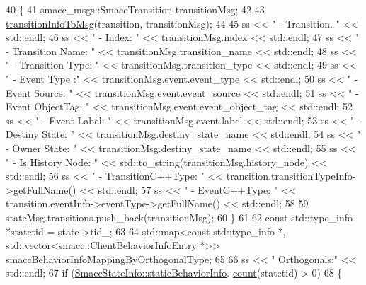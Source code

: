 \begin{DoxyCode}
40             \{
41                 smacc\_msgs::SmaccTransition transitionMsg;
42 
43                 \hyperlink{namespacesmacc_1_1introspection_a6c1b51c4d44fd5e41fe218f1ee150681}{transitionInfoToMsg}(transition, transitionMsg);
44 
45                 ss << \textcolor{stringliteral}{" - Transition.  "} << std::endl;
46                 ss << \textcolor{stringliteral}{"      - Index: "} << transitionMsg.index << std::endl;
47                 ss << \textcolor{stringliteral}{"      - Transition Name: "} << transitionMsg.transition\_name << std::endl;
48                 ss << \textcolor{stringliteral}{"      - Transition Type: "} << transitionMsg.transition\_type << std::endl;
49                 ss << \textcolor{stringliteral}{"      - Event Type :"} << transitionMsg.event.event\_type << std::endl;
50                 ss << \textcolor{stringliteral}{"      - Event Source: "} << transitionMsg.event.event\_source << std::endl;
51                 ss << \textcolor{stringliteral}{"      - Event ObjectTag: "} << transitionMsg.event.event\_object\_tag << std::endl;
52                 ss << \textcolor{stringliteral}{"      - Event Label: "} << transitionMsg.event.label << std::endl;
53                 ss << \textcolor{stringliteral}{"      - Destiny State: "} << transitionMsg.destiny\_state\_name << std::endl;
54                 ss << \textcolor{stringliteral}{"      - Owner State: "} << transitionMsg.destiny\_state\_name << std::endl;
55                 ss << \textcolor{stringliteral}{"      - Is History Node: "} << std::to\_string(transitionMsg.history\_node) << 
      std::endl;
56                 ss << \textcolor{stringliteral}{"      - TransitionC++Type: "} << transition.transitionTypeInfo->getFullName() << 
      std::endl;
57                 ss << \textcolor{stringliteral}{"      - EventC++Type: "} << transition.eventInfo->eventType->getFullName() << 
      std::endl;
58 
59                 stateMsg.transitions.push\_back(transitionMsg);
60             \}
61 
62             \textcolor{keyword}{const} std::type\_info *statetid = state->tid\_;
63 
64             std::map<const std::type\_info *, std::vector<smacc::ClientBehaviorInfoEntry *>> 
      smaccBehaviorInfoMappingByOrthogonalType;
65 
66             ss << \textcolor{stringliteral}{" Orthogonals:"} << std::endl;
67             \textcolor{keywordflow}{if} (\hyperlink{classsmacc_1_1introspection_1_1SmaccStateInfo_ad3d8b3450060cb0b91f38fb2fe0a7678}{SmaccStateInfo::staticBehaviorInfo}.
      \hyperlink{namespacesm__fetch__two__table__whiskey__pour_acbce06cd0c9048e8be6a258e2c406986}{count}(statetid) > 0)
68             \{

\end{DoxyCode}
